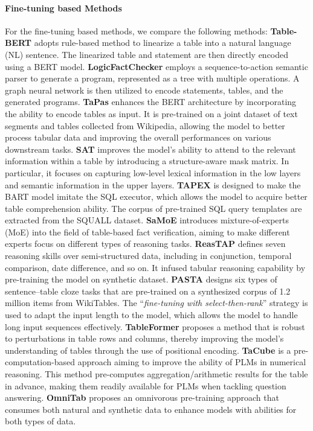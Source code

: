 \documentclass{article}
\begin{document}
\paragraph{ \textbf{Fine-tuning based Methods}} 
For the fine-tuning based methods, we compare the following methods:
\textbf{Table-BERT} \citep{tabfact} adopts rule-based method to linearize a table into a natural language (NL) sentence. The linearized table and statement are then directly encoded using a BERT model.
\textbf{LogicFactChecker} \citep{logicalfactchecker} employs a sequence-to-action semantic parser to generate a program, represented as a tree with multiple operations. A graph neural network is then utilized to encode statements, tables, and the generated programs.
\textbf{TaPas} \citep{tapas} enhances the BERT architecture by incorporating the ability to encode tables as input. It is pre-trained on a joint dataset of text segments and tables collected from Wikipedia, allowing the model to better process tabular data and improving the overall performances on various downstream tasks.
\textbf{SAT} \citep{sat} improves the model's ability to attend to the relevant information within a table by introducing a structure-aware mask matrix. In particular, it focuses on capturing low-level lexical information in the low layers and semantic information in the upper layers.
\textbf{TAPEX} \citep{tapex} is designed to make the BART model imitate the SQL executor, which allows the model to acquire better table comprehension ability. The corpus of pre-trained SQL query templates are extracted from the SQUALL dataset. 
\textbf{SaMoE} \citep{samoe} introduces mixture-of-experts (MoE) \citep{moesurvey} into the field of table-based fact verification, aiming to make different experts focus on different types of reasoning tasks. 
\textbf{ReasTAP} \citep{reastap} defines seven reasoning skills over semi-structured data, including in conjunction, temporal comparison, date difference, and so on. It infused tabular reasoning capability by pre-training the model on synthetic dataset.
\textbf{PASTA} \citep{pasta} designs six types of sentence–table cloze tasks that are pre-trained on a synthesized corpus of 1.2 million items from WikiTables. The ``\textit{fine-tuning with select-then-rank}'' strategy is used to adapt the input length to the model, which allows the model to handle long input sequences effectively. 
\textbf{TableFormer} \citep{tableformer} proposes a method that is robust to perturbations in table rows and columns, thereby improving the model's understanding of tables through the use of positional encoding.
\textbf{TaCube} \citep{tacube} is a pre-computation-based approach aiming to improve the ability of PLMs in numerical reasoning. This method pre-computes aggregation/arithmetic results for the table in advance, making them readily available for PLMs when tackling question answering.
\textbf{OmniTab} \citep{omnitab} proposes an omnivorous pre-training approach that consumes both natural and synthetic data to enhance models with abilities for both types of data.
\end{document}
